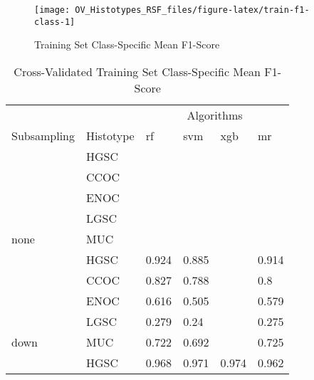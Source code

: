 \documentclass[
]{report}
\begin{document}
\begin{figure}[H]

{\centering \texttt{[image: OV\_Histotypes\_RSF\_files/figure-latex/train-f1-class-1]} 

}

\caption{Training Set Class-Specific Mean F1-Score}\label{fig:train-f1-class}
\end{figure}

\begin{table}

\caption{\label{tab:train-f1-class-table}Cross-Validated Training Set Class-Specific Mean F1-Score}
\centering
\begin{tabular}[t]{l|l|l|l|l|l}
\hline
\multicolumn{2}{c|}{ } & \multicolumn{4}{c}{Algorithms} \\
\cline{3-6}
Subsampling & Histotype & rf & svm & xgb & mr\\
\hline
 & HGSC & \cellcolor[HTML]{FFD700}{0.97} & \cellcolor[HTML]{FFD700}{0.972} & \cellcolor[HTML]{FF0000}{0.9} & \cellcolor[HTML]{FF0000}{0.969}\\
\cline{2-6}
 & CCOC & \cellcolor[HTML]{FFD700}{0.861} & \cellcolor[HTML]{FFD700}{0.836} & \cellcolor[HTML]{FF0000}{0.31} & \cellcolor[HTML]{FF0000}{0.846}\\
\cline{2-6}
 & ENOC & \cellcolor[HTML]{FFD700}{0.641} & \cellcolor[HTML]{FFD700}{0.741} & \cellcolor[HTML]{FF0000}{NaN} & \cellcolor[HTML]{FF0000}{0.72}\\
\cline{2-6}
 & LGSC & \cellcolor[HTML]{FFD700}{0.7} & \cellcolor[HTML]{FFD700}{0.444} & \cellcolor[HTML]{FF0000}{NaN} & \cellcolor[HTML]{FF0000}{NaN}\\
\cline{2-6}
\multirow{-5}{*}{\raggedright\arraybackslash none} & MUC & \cellcolor[HTML]{FFD700}{0.848} & \cellcolor[HTML]{FFD700}{0.834} & \cellcolor[HTML]{FF0000}{NaN} & \cellcolor[HTML]{FF0000}{0.869}\\
\cline{1-6}
 & HGSC & 0.924 & 0.885 & \cellcolor[HTML]{FF0000}{0.904} & 0.914\\
\cline{2-6}
 & CCOC & 0.827 & 0.788 & \cellcolor[HTML]{FF0000}{NaN} & 0.8\\
\cline{2-6}
 & ENOC & 0.616 & 0.505 & \cellcolor[HTML]{FF0000}{0.117} & 0.579\\
\cline{2-6}
 & LGSC & 0.279 & 0.24 & \cellcolor[HTML]{FF0000}{0.032} & 0.275\\
\cline{2-6}
\multirow{-5}{*}{\raggedright\arraybackslash down} & MUC & 0.722 & 0.692 & \cellcolor[HTML]{FF0000}{NaN} & 0.725\\
\cline{1-6}
 & HGSC & 0.968 & 0.971 & 0.974 & 0.962\\

\end{tabular}
\end{table}
\end{document}
